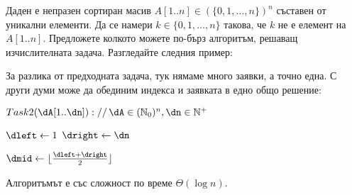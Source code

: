 \begin{problem}\label{prob-4-1}
	Даден е непразен сортиран масив $A[1..n]\in(\{0,1,\dots,n\})^n$ съставен от уникални елементи. Да се намери $k\in\{0,1,\dots,n\}$ такова, че $k$ не е елемент на $A[1..n]$. Предложете колкото можете по-бърз алгоритъм, решаващ изчислителната задача. Разгледайте следния пример:
\end{problem}
\begin{solution}
	За разлика от предходната задача, тук нямаме много заявки, а точно една. С други думи може да обединим индекса и заявката в едно общо решение:
	\begin{pseudocode}
		
		$Task2(\dA[1..\dn])://\,\dA\in(\mathbb{N}_0)^n,\dn\in\mathbb{N}^+$
		\Mybegin
		{
			$\dleft\leftarrow1$\;
			$\dright\leftarrow\dn$\;
			
			\While{$\dleft<\dright$}
			{
				$\dmid\leftarrow\lfloor\frac{\dleft+\dright}2\rfloor$\;
				\Else{$\dright\leftarrow\dmid$\;}
			}
		}
	\end{pseudocode}
	Алгоритъмът е със сложност по време $\Theta(\log n)$.
\end{solution}\vspace{0.5cm}

